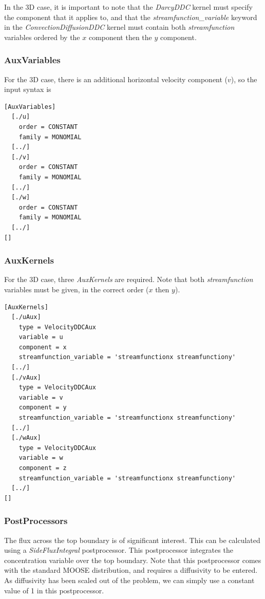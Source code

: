 \documentclass[11pt, a4paper]{csiroreport2012}
\begin{document}
In the 3D case, it is important to note that the \emph{DarcyDDC} kernel must specify the component that it applies to, and that the \emph{streamfunction\_variable} keyword in the \emph{ConvectionDiffusionDDC} kernel must contain both \emph{streamfunction} variables ordered by the $x$ component then the $y$ component.

\subsubsection*{AuxVariables}

For the 3D case, there is an additional horizontal velocity component ($v$), so the input syntax is
\begin{shaded}
\begin{verbatim}
[AuxVariables]
  [./u]
    order = CONSTANT
    family = MONOMIAL
  [../]
  [./v]
    order = CONSTANT
    family = MONOMIAL
  [../]
  [./w]
    order = CONSTANT
    family = MONOMIAL
  [../]
[]
\end{verbatim}
\end{shaded}

\subsubsection*{AuxKernels}

For the 3D case, three \emph{AuxKernels} are required. Note that both \emph{streamfunction} variables must be given, in the correct order ($x$ then $y$). 
\begin{shaded}
\begin{verbatim}
[AuxKernels]
  [./uAux]
    type = VelocityDDCAux
    variable = u
    component = x
    streamfunction_variable = 'streamfunctionx streamfunctiony'
  [../]
  [./vAux]
    type = VelocityDDCAux
    variable = v
    component = y
    streamfunction_variable = 'streamfunctionx streamfunctiony'
  [../]
  [./wAux]
    type = VelocityDDCAux
    variable = w
    component = z
    streamfunction_variable = 'streamfunctionx streamfunctiony'
  [../]
[]
\end{verbatim}
\end{shaded}

\subsubsection*{PostProcessors}

The flux across the top boundary is of significant interest. This can be calculated using a \emph{SideFluxIntegral} postprocessor. This postprocessor integrates the concentration variable over the top boundary. Note that this postprocessor comes with the standard MOOSE distribution, and requires a diffusivity to be entered. As diffusivity has been scaled out of the problem, we can simply use a constant value of 1 in this postprocessor.
\end{document}
